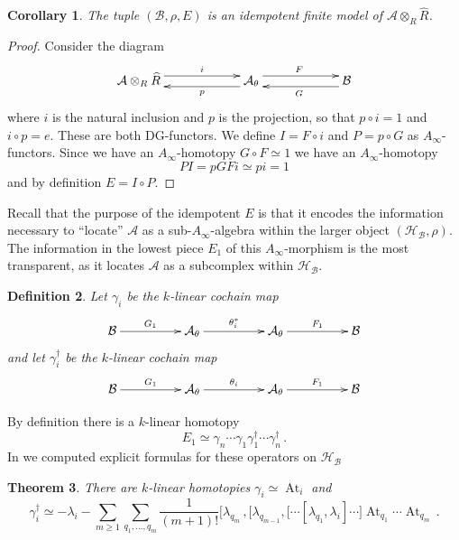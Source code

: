 \documentclass[english,letter paper,12pt,leqno]{article}
\newtheorem{theorem}{Theorem}[section]
\newtheorem{corollary}[theorem]{Corollary}
\theoremstyle{example}
\newtheorem{definition}[theorem]{Definition}
\numberwithin{equation}{section}
\def\AA{\mathcal{A}}
\def\BB{\mathcal{B}}
\def\HH{\HH}
\def\HH{\mathcal{H}}
\def\be{\begin{equation}}
\def\ee{\end{equation}}
\DeclareMathOperator{\At}{At}
\DeclareMathOperator{\vAt}{At}
\begin{document}
\begin{corollary}\label{corollary:idempotent_finite_model} The tuple $(\BB, \rho, E)$ is an idempotent finite model of $\AA \otimes_R \widehat{R}$.
\end{corollary}
\begin{proof}
Consider the diagram
\[
\xymatrix@C+3pc{
\AA \otimes_R \widehat{R} \ar@<1ex>[r]^-{i} & \AA_\theta \ar@<1ex>[l]^-{p} \ar@<1ex>[r]^F & \BB \ar@<1ex>[l]^G
}
\]
where $i$ is the natural inclusion and $p$ is the projection, so that $p \circ i = 1$ and $i \circ p = e$. These are both DG-functors. We define $I = F \circ i$ and $P = p \circ G$ as $A_\infty$-functors. Since we have an $A_\infty$-homotopy $G \circ F \simeq 1$ we have an $A_\infty$-homotopy
\[
P I = p G F i \simeq p i = 1
\]
and by definition $E = I \circ P$.
\end{proof}

Recall that the purpose of the idempotent $E$ is that it encodes the information necessary to ``locate'' $\AA$ as a sub-$A_\infty$-algebra within the larger object $(\HH_{\BB}, \rho)$. The information in the lowest piece $E_1$ of this $A_\infty$-morphism is the most transparent, as it locates $\AA$ as a subcomplex within $\HH_{\BB}$. 

\begin{definition}\label{defn:gamma_anddagger} Let $\gamma_i$ be the $k$-linear cochain map
\[
\xymatrix@C+2pc{
\BB \ar[r]^-{G_1} & \AA_{\theta} \ar[r]^-{\theta_i^*} & \AA_{\theta} \ar[r]^-{F_1} & \BB
}
\]
and let $\gamma_i^\dagger$ be the $k$-linear cochain map
\[
\xymatrix@C+2pc{
\BB \ar[r]^-{G_1} & \AA_{\theta} \ar[r]^-{\theta_i} & \AA_{\theta} \ar[r]^-{F_1} & \BB
}
\]
\end{definition}

By definition there is a $k$-linear homotopy
\[
E_1 \simeq \gamma_n \cdots \gamma_1 \gamma_1^\dagger \cdots \gamma_n^\dagger\,.
\]
In \cite{cut} we computed explicit formulas for these operators on $\HH_{\BB}$ %

\begin{theorem}\label{theorem:homotopy_clifford} There are $k$-linear homotopies $\gamma_i \simeq \vAt_i$ and
\be
\gamma_i^\dagger \simeq -\lambda_i - \sum_{m \ge 1} \sum_{q_1,\ldots,q_m} \frac{1}{(m+1)!} \big[ \lambda_{q_m}\,, \big[ \lambda_{q_{m-1}}, \big[ \cdots [ \lambda_{q_1}, \lambda_i ] \cdots \big] \At_{q_1} \cdots \At_{q_m}\,.
\ee
\end{theorem}
\end{document}
